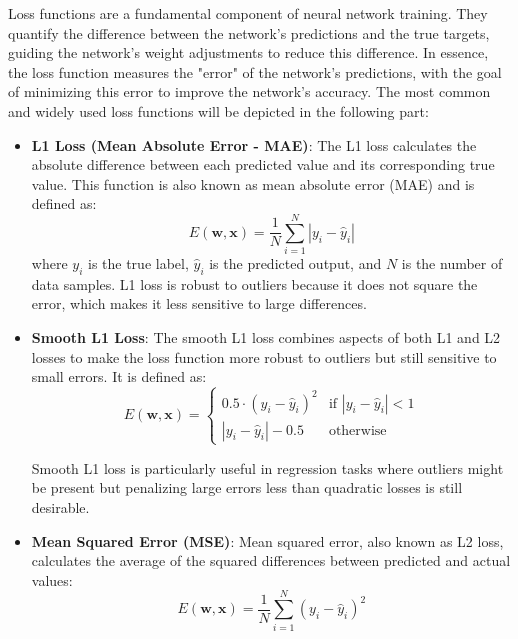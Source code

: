 Loss functions are a fundamental component of neural network training. They quantify the difference between the network's predictions and the true targets, guiding the network’s weight adjustments to reduce this difference. In essence, the loss function measures the "error" of the network's predictions, with the goal of minimizing this error to improve the network's accuracy.
The most common and widely used loss functions will be depicted in the following part:
\begin{itemize}
    \item \textbf{L1 Loss (Mean Absolute Error - MAE)}:  
    The L1 loss calculates the absolute difference between each predicted value and its corresponding true value. This function is also known as mean absolute error (MAE) and is defined as:
    \begin{equation}
        E(\mathbf{w}, \mathbf{x}) = \frac{1}{N} \sum_{i=1}^{N} |y_i - \hat{y}_i|
    \end{equation}
    where \( y_i \) is the true label, \( \hat{y}_i \) is the predicted output, and \( N \) is the number of data samples. L1 loss is robust to outliers because it does not square the error, which makes it less sensitive to large differences.

    \item \textbf{Smooth L1 Loss}:  
    The smooth L1 loss combines aspects of both L1 and L2 losses to make the loss function more robust to outliers but still sensitive to small errors. It is defined as:
    \begin{equation}
        E(\mathbf{w}, \mathbf{x}) = 
        \begin{cases} 
            0.5 \cdot (y_i - \hat{y}_i)^2 & \text{if } |y_i - \hat{y}_i| < 1 \\
          |y_i - \hat{y}_i| - 0.5 & \text{otherwise}
        \end{cases}
    \end{equation}

    Smooth L1 loss is particularly useful in regression tasks where outliers might be present but penalizing large errors less than quadratic losses is still desirable.

    \item \textbf{Mean Squared Error (MSE)}:  
    Mean squared error, also known as L2 loss, calculates the average of the squared differences between predicted and actual values:
    \begin{equation}
        E(\mathbf{w}, \mathbf{x}) = \frac{1}{N} \sum_{i=1}^{N} (y_i - \hat{y}_i)^2
    \end{equation}
   

\end{itemize}
